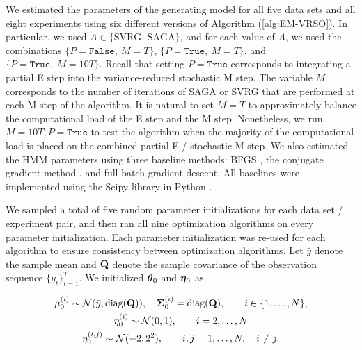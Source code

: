 We estimated the parameters of the generating model for all five data sets and all eight experiments using six different versions of Algorithm (\ref{alg:EM-VRSO}). In particular, we used $A \in \{\text{SVRG, SAGA}\}$, and for each value of $A$, we used the combinations $\{P = \texttt{False}, ~ M = T\}$, $\{P = \texttt{True}, ~ M = T\}$, and $\{P = \texttt{True}, ~ M = 10T\}$. Recall that setting $P = \texttt{True}$ corresponds to integrating a partial E step into the variance-reduced stochastic M step. The variable $M$ corresponds to the number of iterations of SAGA or SVRG that are performed at each M step of the algorithm. It is natural to set $M=T$ to approximately balance the computational load of the E step and the M step. Nonetheless, we run $M=10T, P = \texttt{True}$ to test the algorithm when the majority of the computational load is placed on the combined partial E / stochastic M step. We also estimated the HMM parameters using three baseline methods: BFGS \citep{Fletcher:2000}, the conjugate gradient method \citep{Fletcher:1964}, and full-batch gradient descent. All baselines were implemented using the Scipy library in Python \citep{Virtanen:2019}.

We sampled a total of five random parameter initializations for each data set / experiment pair, and then ran all nine optimization algorithms on every parameter initialization. Each parameter initialization was re-used for each algorithm to ensure consistency between optimization algorithms. Let $\bar y$ denote the sample mean and $\mathbf{Q}$ denote the sample covariance of the observation sequence $\{y_t\}_{t=1}^T$. We initialized $\boldsymbol{\theta}_0$ and $\boldsymbol{\eta}_0$ as

\begin{gather*}
    \mu^{(i)}_0 \sim \mathcal{N}(\bar y, \text{diag}(\mathbf{Q})), \quad \boldsymbol{\Sigma}^{(i)}_0 = \text{diag}(\mathbf{Q}), \qquad i \in \{1,\ldots,N\}, \\
    \eta^{(i)}_0 \sim \mathcal{N}(0,1), \qquad i = 2,\ldots,N \\
    \eta^{(i,j)}_0 \sim \mathcal{N}(-2,2^2), \qquad i,j = 1,\ldots,N, \quad i \neq j.
\end{gather*}
%

